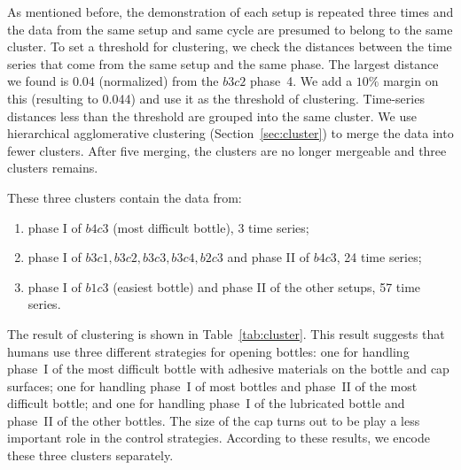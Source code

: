  
As mentioned before, the demonstration of each setup is repeated three
times and the data from the same setup and same cycle are presumed to
belong to the same cluster. To set a threshold for clustering, we
check the distances between the time series that come from the same
setup and the same phase. The largest distance we found is 0.04
(normalized) from the $b3c2$ phase~4. We add a $10\%$ margin on this
(resulting to 0.044) and use it as the threshold of
clustering. Time-series distances less than the threshold are grouped
into the same cluster. We use hierarchical agglomerative
clustering (Section~\ref{sec:cluster}) to merge the data into
fewer clusters. After five merging, the clusters are no longer
mergeable and three clusters remains.

These three clusters contain the data from:

\begin{enumerate}
\item phase I of $b4c3$ (most difficult bottle), 3 time series;
\item phase I of $b3c1, b3c2, b3c3, b3c4, b2c3$ and phase II of $b4c3$, 24 time series;
\item phase I of $b1c3$ (easiest bottle) and phase II of the other setups, 57 time series.
\end{enumerate}

The result of clustering is shown in Table~\ref{tab:cluster}. This
result suggests that humans use three different strategies for opening
bottles: one for handling phase~I of the most difficult bottle with
adhesive materials on the bottle and cap surfaces; one for handling
phase~I of most bottles and phase~II of the most difficult bottle; and
one for handling phase~I of the lubricated bottle and phase~II of the
other bottles. The size of the cap turns out to be play a less
important role in the control strategies. According to these results, we
encode these three clusters separately.


